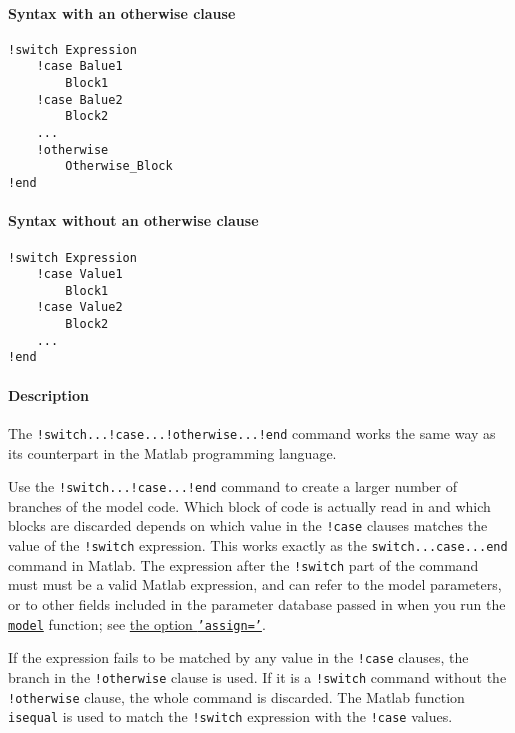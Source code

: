 


	\paragraph{Syntax with an otherwise
clause}

\begin{verbatim}
!switch Expression
    !case Balue1
        Block1
    !case Balue2
        Block2
    ...
    !otherwise
        Otherwise_Block
!end
\end{verbatim}

\paragraph{Syntax without an otherwise
clause}

\begin{verbatim}
!switch Expression
    !case Value1
        Block1
    !case Value2
        Block2
    ...
!end
\end{verbatim}

\paragraph{Description}

The \texttt{!switch...!case...!otherwise...!end} command works the same
way as its counterpart in the Matlab programming language.

Use the \texttt{!switch...!case...!end} command to create a larger
number of branches of the model code. Which block of code is actually
read in and which blocks are discarded depends on which value in the
\texttt{!case} clauses matches the value of the \texttt{!switch}
expression. This works exactly as the \texttt{switch...case...end}
command in Matlab. The expression after the \texttt{!switch} part of the
command must must be a valid Matlab expression, and can refer to the
model parameters, or to other fields included in the parameter database
passed in when you run the \href{model/model}{\texttt{model}} function;
see \href{model/model}{the option \texttt{'assign='}}.

If the expression fails to be matched by any value in the \texttt{!case}
clauses, the branch in the \texttt{!otherwise} clause is used. If it is
a \texttt{!switch} command without the \texttt{!otherwise} clause, the
whole command is discarded. The Matlab function \texttt{isequal} is used
to match the \texttt{!switch} expression with the \texttt{!case} values.

